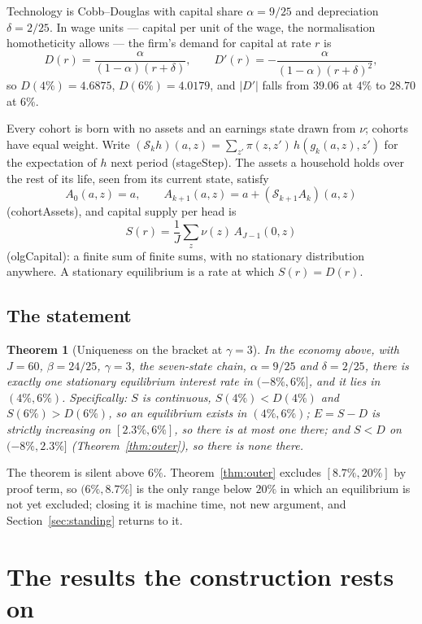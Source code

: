 \documentclass[11pt]{article}
\newtheorem{theorem}{Theorem}[section]
\theoremstyle{definition}
\theoremstyle{remark}
\newcommand{\leanunderscore}{\char`\_\hskip 0pt plus 0.4pt\relax}
\newcommand{\lean}[1]{\begingroup\ttfamily\small\let\_\leanunderscore #1\endgroup}
\begin{document}
Technology is Cobb--Douglas with capital share $\alpha=9/25$ and depreciation $\delta=2/25$. In
wage units --- capital per unit of the wage, the normalisation homotheticity allows --- the firm's
demand for capital at rate $r$ is
\[
  D(r)=\frac{\alpha}{(1-\alpha)(r+\delta)},\qquad
  D'(r)=-\frac{\alpha}{(1-\alpha)(r+\delta)^2},
\]
so $D(4\%)=4.6875$, $D(6\%)=4.0179$, and $|D'|$ falls from $39.06$ at $4\%$ to $28.70$ at $6\%$.

Every cohort is born with no assets and an earnings state drawn from $\nu$; cohorts have equal
weight. Write $(\mathcal S_kh)(a,z)=\sum_{z'}\pi(z,z')\,h(g_k(a,z),z')$ for the expectation of $h$
next period (\lean{stageStep}). The assets a household holds over the rest of its life, seen from its
current state, satisfy
\[
  A_0(a,z)=a,\qquad A_{k+1}(a,z)=a+(\mathcal S_{k+1}A_k)(a,z)
\]
(\lean{cohortAssets}), and capital supply per head is
\[
  S(r)=\frac1J\sum_z\nu(z)\,A_{J-1}(0,z)
\]
(\lean{olgCapital}): a finite sum of finite sums, with no stationary distribution anywhere. A
stationary equilibrium is a rate at which $S(r)=D(r)$.

\subsection{The statement}

\begin{theorem}[Uniqueness on the bracket at $\gamma=3$]\label{thm:main}
In the economy above, with $J=60$, $\beta=24/25$, $\gamma=3$, the seven-state chain, $\alpha=9/25$
and $\delta=2/25$, there is exactly one stationary equilibrium interest rate in $(-8\%,6\%]$, and
it lies in $(4\%,6\%)$. Specifically: $S$ is continuous, $S(4\%)<D(4\%)$ and $S(6\%)>D(6\%)$, so
an equilibrium exists in $(4\%,6\%)$; $E=S-D$ is strictly increasing on $[2.3\%,6\%]$, so there is
at most one there; and $S<D$ on $(-8\%,2.3\%]$ (Theorem~\ref{thm:outer}), so there is none there.
\end{theorem}

The theorem is silent above $6\%$. Theorem~\ref{thm:outer} excludes $[8.7\%,20\%]$ by proof term,
so $(6\%,8.7\%]$ is the only range below $20\%$ in which an equilibrium is not yet excluded;
closing it is machine time, not new argument, and Section~\ref{sec:standing} returns to it.

\section{The results the construction rests on}\label{sec:known}
\end{document}
